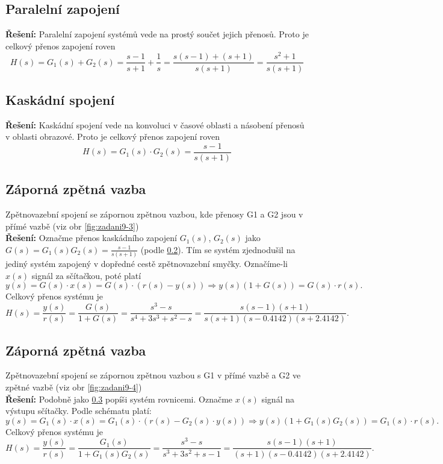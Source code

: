 \documentclass[twoside]{article}
\begin{document}
\subsection{Paralelní zapojení} 
\textbf{Řešení:} Paralelní zapojení systémů vede na prostý součet jejich přenosů. Proto je celkový přenos zapojení roven
\begin{equation*}
	H(s) = G_1(s) + G_2(s) = \frac{s-1}{s+1} + \frac{1}{s} = \frac{s(s-1) + (s+1)}{s(s+1)} = \frac{s^2 + 1}{s (s+1)}
\end{equation*}
\subsection{Kaskádní spojení}
\label{sec:ukol9:2}
\textbf{Řešení:} Kaskádní spojení vede na konvoluci v časové oblasti a násobení přenosů v oblasti obrazové. Proto je celkový přenos zapojení roven
\begin{equation*}
	H(s) = G_1(s) \cdot G_2(s) = \frac{s-1}{s(s+1)}
\end{equation*}
\subsection{Záporná zpětná vazba } 
\label{sec:ukol9:3}
Zpětnovazební spojení se zápornou zpětnou vazbou, kde přenosy G1 a G2 jsou v přímé vazbě (viz obr \ref{fig:zadani9-3}) \\
\textbf{Řešení:} Označme přenos kaskádního zapojení $G_1(s)$, $G_2(s)$ jako $G(s) = G_1(s)G_2(s) = \frac{s-1}{s(s+1)}$ (podle \ref{sec:ukol9:2}).
Tím se systém zjednodušil na jediný systém zapojený v dopředné cestě zpětnovazební smyčky. Označíme-li $x(s)$ signál za sčítačkou, poté platí
\begin{equation*}
	y(s) = G(s) \cdot x(s) = G(s) \cdot (r(s) - y(s)) \Rightarrow y(s) (1 + G(s)) = G(s) \cdot r(s).
\end{equation*}
Celkový přenos systému je
\begin{equation*}
	H(s) = \frac{y(s)}{r(s)} = \frac{G(s)}{1 + G(s)} = \frac{s^3 - s}{s^4 + 3s^3 + s^2 - s} = \frac{s(s-1)(s+1)}{s(s+1)(s-0.4142)(s+2.4142)}.
\end{equation*}
\subsection{Záporná zpětná vazba } 
Zpětnovazební spojení se zápornou zpětnou vazbou s G1 v přímé vazbě a G2 ve zpětné vazbě (viz obr \ref{fig:zadani9-4}) \\
\textbf{Řešení:} Podobně jako \ref{sec:ukol9:3} popíši systém rovnicemi. Označme $x(s)$ signál na výstupu sčítačky. Podle schématu platí:
\begin{equation*}
	y(s) = G_1(s) \cdot x(s) = G_1(s) \cdot (r(s) - G_2(s) \cdot y(s)) \Rightarrow y(s) (1 + G_1(s)G_2(s)) = G_1(s) \cdot r(s).
\end{equation*}
Celkový přenos systému je
\begin{equation*}
	H(s) = \frac{y(s)}{r(s)} = \frac{G_1(s)}{1 + G_1(s)G_2(s)} = \frac{s^3 - s}{s^3 + 3s^2 +s - 1} = \frac{s(s-1)(s+1)}{(s+1)(s-0.4142)(s+2.4142)}.
\end{equation*}
\end{document}
